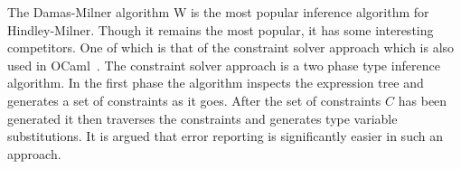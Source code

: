 \documentclass[11pt,oneside,a4paper]{report}
\begin{document}
\begin{remark}
    The Damas-Milner algorithm W is the most popular inference algorithm for Hindley-Milner.
    Though it remains the most popular, it has some interesting competitors.
    One of which is that of the constraint solver approach which is also used in OCaml~\cite{heeren2002generalizing}.
    The constraint solver approach is a two phase type inference algorithm.
    In the first phase the algorithm inspects the expression tree and generates a set of constraints as it goes.
    After the set of constraints $C$ has been generated it then traverses the constraints and generates type variable substitutions.
    It is argued that error reporting is significantly easier in such an approach.
\end{remark}
\end{document}
